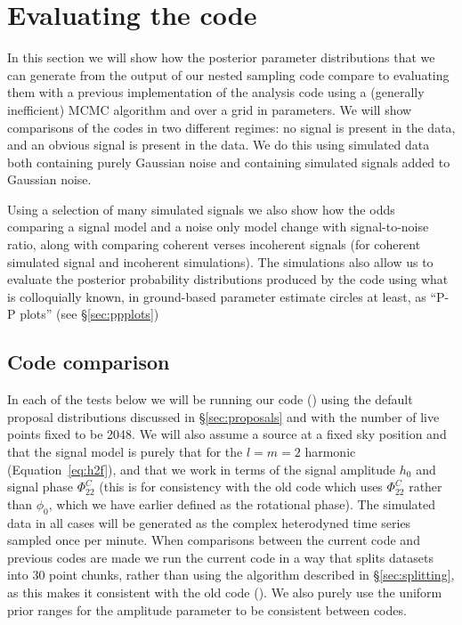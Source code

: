 \section{Evaluating the code}\label{sec:codeeval}

In this section we will show how the posterior parameter distributions that we can generate from the output
of our nested sampling code compare to evaluating them with a previous implementation of the analysis code
\citep[\lppef, or for the rest of this document shortened to \lppe, used in, e.g.,][]{2014ApJ...785..119A} using a (generally inefficient) MCMC algorithm
and over a grid in parameters. We will show comparisons of the codes in two different regimes: no signal is present in the data, and an obvious signal is
present in the data. We do this using simulated data both containing purely Gaussian noise and containing simulated signals
added to Gaussian noise.

Using a selection of many simulated signals we also show how the odds comparing a signal model and a noise only model change with
signal-to-noise ratio, along with comparing coherent verses incoherent signals (for coherent simulated signal and incoherent simulations).
The simulations also allow us to evaluate the posterior probability distributions produced by the code using what is colloquially known,
in ground-based \gw parameter estimate circles at least, as ``P-P plots'' (see \S\ref{sec:ppplots})

\subsection{Code comparison}

In each of the tests below we will be running our code (\lppen) using the default proposal distributions discussed in \S\ref{sec:proposals}
and with the number of live points fixed to be 2048. We will also assume a source at a fixed sky position and that the signal model is purely
that for the $l=m=2$ harmonic (Equation~\ref{eq:h2f}), and that we work in terms of the signal amplitude $h_0$ and signal phase
$\Phi_{22}^C$ (this is for consistency with the old code which uses $\Phi_{22}^C$ rather than $\phi_0$, which we have earlier defined as the
rotational phase). The simulated data in all cases 
will be generated as the complex heterodyned
time series sampled once per minute. When comparisons between the current code and previous codes are 
made we run the current code in a way that splits datasets into 30 point chunks, rather than using the algorithm described in \S\ref{sec:splitting},
as this makes it consistent with the old code (\lppe). We also purely use the uniform prior ranges for the amplitude parameter to be
consistent between codes.


